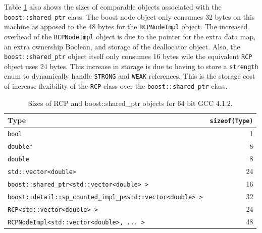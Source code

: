 \documentclass[pdf,ps2pdf,11pt]{SANDreport}
\begin{document}
Table {}\ref{tbl:RCP-SP-sizes} also shows the sizes of comparable
objects associated with the {}\texttt{boost::shared\_ptr} class.  The
boost node object only consumes 32 bytes on this machine as apposed to
the 48 bytes for the {}\texttt{RCPNodeImpl} object.  The increased
overhead of the {}\texttt{RCPNodeImpl} object is due to the pointer
for the extra data map, an extra ownership Boolean, and storage of the
deallocator object.  Also, the {}\texttt{boost::shared\_ptr} object
itself only consumes 16 bytes wile the equivalent {}\texttt{RCP}
object uses 24 bytes.  This increase in storage is due to having to
store a {}\texttt{strength} enum to dynamically handle
{}\texttt{STRONG} and {}\texttt{WEAK} references.  This is the storage
cost of increase flexibility of the {}\texttt{RCP} class over the
{}\texttt{boost::shared\_ptr} class.

\begin{table}
\begin{center}
\begin{tabular}{|l|r|}
\hline
Type
& {}\texttt{sizeof(Type)} \\
\hline
{}\texttt{bool}
& 1 \\
\hline
{}\texttt{double*}
& 8 \\
\hline
{}\texttt{double}
& 8 \\
\hline
{}\texttt{std::vector<double>}
& 24 \\
\hline
{}\texttt{boost::shared\_ptr<std::vector<double> >}
& 16 \\
\hline
{}\texttt{boost::detail::sp\_counted\_impl\_p<std::vector<double> >}
& 32 \\
\hline
{}\texttt{RCP<std::vector<double> >}
& 24 \\
\hline
{}\texttt{RCPNodeImpl<std::vector<double>, ... >}
& 48 \\
\hline
\end{tabular}
\end{center}
\caption{\label{tbl:RCP-SP-sizes}
Sizes of RCP and boost::shared\_ptr objects for 64 bit GCC 4.1.2.}
\end{table}
\end{document}
